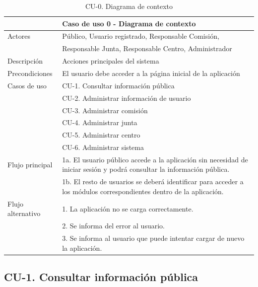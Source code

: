 \begin{table}[H]
\caption{CU-0. Diagrama de contexto}\label{tab:CU-0}
\begin{center}
    \begin{tabular}{|l|p{12cm}|}
    \hline
    \multicolumn{2}{|c|}{Caso de uso 0 - Diagrama de contexto} \\ 
    \hline \hline
    Actores                 &   Público, Usuario registrado, Responsable Comisión,\\ 
                            &  Responsable Junta,  Responsable Centro, Administrador \\ \hline
    Descripción             &   Acciones principales del sistema\\  \hline
    Precondiciones          &   El usuario debe acceder a la página inicial de la aplicación   \\  \hline
    Casos de uso            &   CU-1. Consultar información pública\\  
    & CU-2. Administrar información de usuario\\ 
    & CU-3. Administrar comisión\\
    & CU-4. Administrar junta \\
    & CU-5. Administrar centro \\
    & CU-6. Administrar sistema \\
    \hline
    Flujo principal     &  1a. El usuario público accede a la aplicación sin necesidad de iniciar sesión y podrá consultar la información pública. \\
        & 1b. El resto de usuarios se deberá identificar para acceder a los módulos correspondientes dentro de la aplicación.
    \\ \hline
    Flujo alternativo    & 1. La aplicación no se carga correctamente. \\
      & 2. Se informa del error al usuario. \\
      & 3. Se informa al usuario que puede intentar cargar de nuevo la aplicación.
    \\  \hline
    \end{tabular}
    \end{center}
    \end{table}

\newpage

\subsection{CU-1. Consultar información pública}\label{sec:CU-1}

